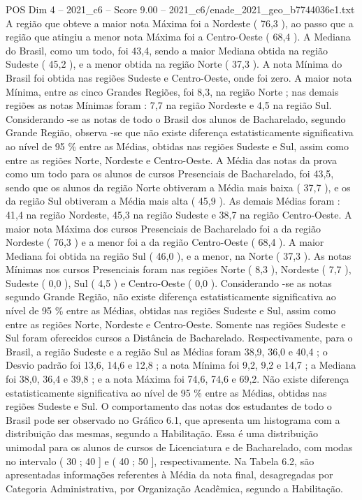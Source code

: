 \begin{textsample}{POS Dim 4 – 2021\_c6 – Score 9.00 – 2021\_c6/enade\_2021\_geo\_b7744036e1.txt}
A região que obteve a maior nota Máxima foi a Nordeste ( 76,3 ), ao passo que a região que atingiu a menor nota Máxima foi a Centro-Oeste ( 68,4 ).
A Mediana do Brasil, como um todo, foi 43,4, sendo a maior Mediana obtida na região Sudeste ( 45,2 ), e a menor obtida na região Norte ( 37,3 ).
A nota Mínima do Brasil foi obtida nas regiões Sudeste e Centro-Oeste, onde foi zero.
A maior nota Mínima, entre as cinco Grandes Regiões, foi 8,3, na região Norte ; nas demais regiões as notas Mínimas foram : 7,7 na região Nordeste e 4,5 na região Sul.
Considerando -se as notas de todo o Brasil dos alunos de Bacharelado, segundo Grande Região, observa -se que não existe diferença estatisticamente significativa ao nível de 95 \% entre as Médias, obtidas nas regiões Sudeste e Sul, assim como entre as regiões Norte, Nordeste e Centro-Oeste.
A Média das notas da prova como um todo para os alunos de cursos Presenciais de Bacharelado, foi 43,5, sendo que os alunos da região Norte obtiveram a Média mais baixa ( 37,7 ), e os da região Sul obtiveram a Média mais alta ( 45,9 ).
As demais Médias foram : 41,4 na região Nordeste, 45,3 na região Sudeste e 38,7 na região Centro-Oeste.
A maior nota Máxima dos cursos Presenciais de Bacharelado foi a da região Nordeste ( 76,3 ) e a menor foi a da região Centro-Oeste ( 68,4 ).
A maior Mediana foi obtida na região Sul ( 46,0 ), e a menor, na Norte ( 37,3 ).
As notas Mínimas nos cursos Presenciais foram nas regiões Norte ( 8,3 ), Nordeste ( 7,7 ), Sudeste ( 0,0 ), Sul ( 4,5 ) e Centro-Oeste ( 0,0 ).
Considerando -se as notas segundo Grande Região, não existe diferença estatisticamente significativa ao nível de 95 \% entre as Médias, obtidas nas regiões Sudeste e Sul, assim como entre as regiões Norte, Nordeste e Centro-Oeste.
Somente nas regiões Sudeste e Sul foram oferecidos cursos a Distância de Bacharelado.
Respectivamente, para o Brasil, a região Sudeste e a região Sul as Médias foram 38,9, 36,0 e 40,4 ; o Desvio padrão foi 13,6, 14,6 e 12,8 ; a nota Mínima foi 9,2, 9,2 e 14,7 ; a Mediana foi 38,0, 36,4 e 39,8 ; e a nota Máxima foi 74,6, 74,6 e 69,2.
Não existe diferença estatisticamente significativa ao nível de 95 \% entre as Médias, obtidas nas regiões Sudeste e Sul.
O comportamento das notas dos estudantes de todo o Brasil pode ser observado no Gráfico 6.1, que apresenta um histograma com a distribuição das mesmas, segundo a Habilitação.
Essa é uma distribuição unimodal para os alunos de cursos de Licenciatura e de Bacharelado, com modas no intervalo ( 30 ; 40 ] e ( 40 ; 50 ], respectivamente.
Na Tabela 6.2, são apresentadas informações referentes à Média da nota final, desagregadas por Categoria Administrativa, por Organização Acadêmica, segundo a Habilitação.

\end{textsample}
